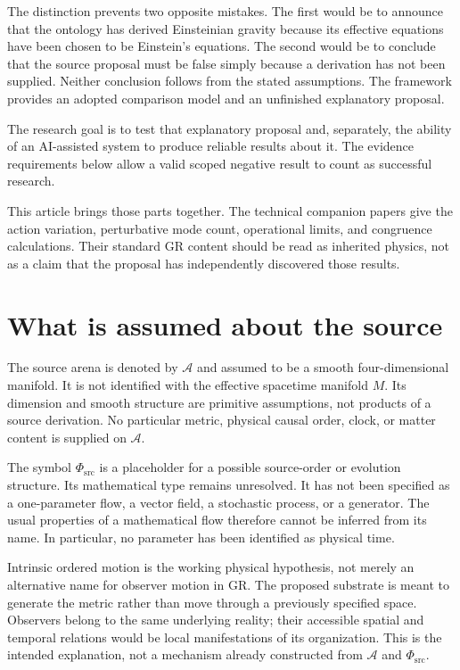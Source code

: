 \documentclass[11pt,oneside]{report}
\newcommand{\Sub}{\mathcal A}
\newcommand{\PhiSrc}{\Phi_{\mathrm{src}}}
\theoremstyle{remark}
\numberwithin{definition}{chapter}
\numberwithin{proposition}{chapter}
\numberwithin{remark}{chapter}
\begin{document}
The distinction prevents two opposite mistakes. The first would be to announce that the ontology has derived Einsteinian gravity because its effective equations have been chosen to be Einstein's equations. The second would be to conclude that the source proposal must be false simply because a derivation has not been supplied. Neither conclusion follows from the stated assumptions. The framework provides an adopted comparison model and an unfinished explanatory proposal.

The research goal is to test that explanatory proposal and, separately, the ability of an AI-assisted system to produce reliable results about it. The evidence requirements below allow a valid scoped negative result to count as successful research.

This article brings those parts together. The technical companion papers give the action variation, perturbative mode count, operational limits, and congruence calculations. Their standard GR content should be read as inherited physics, not as a claim that the proposal has independently discovered those results.

\section{What is assumed about the source}
The source arena is denoted by $\Sub$ and assumed to be a smooth four-dimensional manifold. It is not identified with the effective spacetime manifold $M$. Its dimension and smooth structure are primitive assumptions, not products of a source derivation. No particular metric, physical causal order, clock, or matter content is supplied on $\Sub$.

The symbol $\PhiSrc$ is a placeholder for a possible source-order or evolution structure. Its mathematical type remains unresolved. It has not been specified as a one-parameter flow, a vector field, a stochastic process, or a generator. The usual properties of a mathematical flow therefore cannot be inferred from its name. In particular, no parameter has been identified as physical time.

Intrinsic ordered motion is the working physical hypothesis, not merely an alternative name for observer motion in GR. The proposed substrate is meant to generate the metric rather than move through a previously specified space. Observers belong to the same underlying reality; their accessible spatial and temporal relations would be local manifestations of its organization. This is the intended explanation, not a mechanism already constructed from $\Sub$ and $\PhiSrc$.
\end{document}
